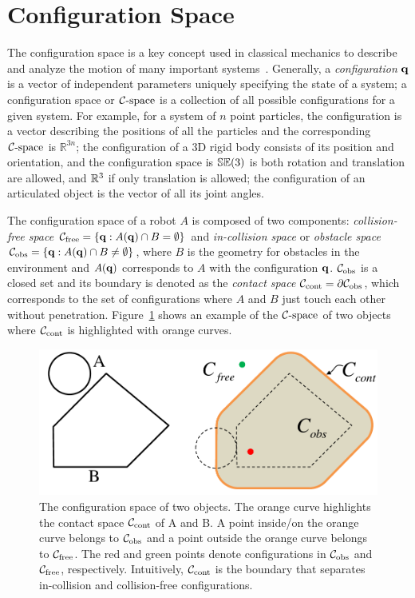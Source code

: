 \section{Configuration Space}
\label{sec:1:configurationSpace}
The configuration space is a key concept used in classical mechanics to describe and analyze the motion of many important systems~\cite{Arnold:1989}. Generally, a \emph{configuration} $\mathbf q$ is a vector of independent parameters uniquely specifying the state of a system; a configuration space or $\mathcal C\text{-space}$ is a collection of all possible configurations for a given system. For example, for a system of $n$ point particles, the configuration is a vector describing the positions of all the particles and the corresponding $\mathcal C\text{-space}$ is $\mathbb R^{3n}$; the configuration of a 3D rigid body consists of its position and orientation, and the configuration space is $\mathbb {SE}(3)$ is both rotation and translation are allowed, and $\mathbb R^3$ if only translation is allowed; the configuration of an articulated object is the vector of all its joint angles.

The configuration space of a robot $A$ is composed of two components: \emph{collision-free space} $\mathcal C_{\text{free}} = \{\mathbf q: A(\mathbf q) \cap B = \emptyset\}$ and \emph{in-collision space} or \emph{obstacle space} $\mathcal C_{\text{obs}} = \{\mathbf q: A(\mathbf q) \cap B \neq \emptyset\}$, where $B$ is the geometry for obstacles in the environment and $A(\mathbf q)$ corresponds to $A$ with the configuration $\mathbf q$. $\mathcal C_{\text{obs}}$ is a closed set and its boundary is denoted as the \emph{contact space} $\mathcal C_\text{cont} = \partial \mathcal C_{\text{obs}}$, which corresponds to the set of configurations where $A$ and $B$ just touch each other without penetration. Figure~\ref{fig:1:contactspace} shows an example of the $\mathcal C\text{-space}$ of two objects where $\mathcal C_\text{cont}$ is highlighted with orange curves.

\begin{figure}[htb]
  \centering
  \includegraphics[width=0.6\linewidth]{figs/1/Ccont.pdf}
  \caption[The configuration space of two objects]{The configuration space of two objects. The orange curve highlights the contact space $\mathcal C_\text{cont}$ of A and B. A point inside/on the orange curve belongs to
  $\mathcal C_{\text{obs}}$ and a point outside the orange curve belongs to $\mathcal C_{\text{free}}$.
  The red and green points denote configurations in $\mathcal C_{\text{obs}}$ and $\mathcal C_{\text{free}}$, respectively. Intuitively, $\mathcal C_\text{cont}$ is the boundary that separates in-collision and collision-free configurations.}
  \label{fig:1:contactspace}
\end{figure}

